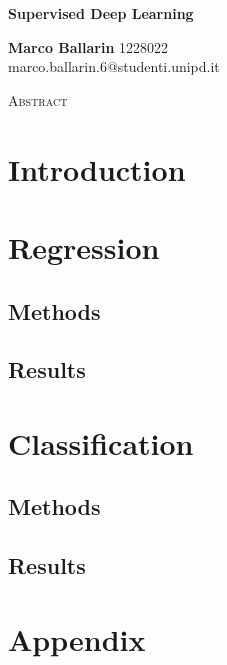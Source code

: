 \documentclass{article}
\begin{document}
\begin{center}
    \huge
    \textbf{Supervised Deep Learning}  %
    
    \normalsize
    \vspace{0.4cm}
    \textbf{Marco Ballarin} 1228022  \\ %
    marco.ballarin.6@studenti.unipd.it

    \vspace{0.5cm}
    \Large
    \textsc{ Abstract}
    \begin{adjustwidth}{30pt}{30pt}
    \normalsize
    \vspace{0.3cm}
    
    \end{adjustwidth}
\end{center}
\vspace{0.2cm}

\section{Introduction \label{sec:int}}


\section{Regression \label{sec:reg}}

\subsection{Methods \label{sec:meth_reg}}


\subsection{Results \label{sec:res_reg}}


\section{Classification \label{sec:class}}
\subsection{Methods \label{sec:meth_class}}


\subsection{Results \label{sec:res_class}}


\newpage
\section{Appendix \label{sec:app}}



\end{document}

